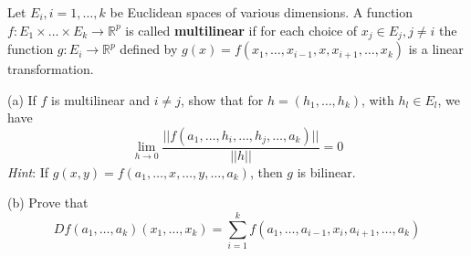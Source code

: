 \begin{exercise}{14}
    Let $E_i, i = 1, \ldots, k$ be Euclidean spaces of various dimensions.
    A function $f: E_1 \times \ldots \times E_k \rightarrow \mathbb{R}^p$ is called \textbf{multilinear} if for each choice of $x_j \in E_j, j \neq i$ the function $g: E_i \rightarrow \mathbb{R}^p$ defined by $g(x) = f(x_1, \ldots, x_{i-1}, x, x_{i+1}, \ldots, x_k)$ is a linear transformation.

    (a) If $f$ is multilinear and $i \neq j$, show that for $h = (h_1, \ldots, h_k)$, with $h_l \in E_l$, we have
    $$\lim_{h \rightarrow 0} \frac{\lvert \lvert f(a_1, \ldots, h_i, \ldots, h_j, \ldots, a_k) \rvert \rvert}{\lvert \lvert h \rvert \rvert} = 0$$
    \textit{Hint}: If $g(x, y) = f(a_1, \ldots, x, \ldots, y, \ldots, a_k)$, then $g$ is bilinear.

    (b) Prove that
    $$Df(a_1, \ldots, a_k)(x_1, \ldots, x_k) = \sum_{i=1}^{k} f(a_1, \ldots, a_{i-1}, x_i, a_{i+1}, \ldots, a_k)$$
\end{exercise}


